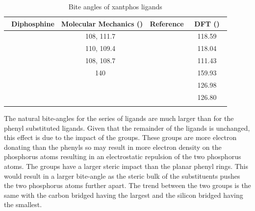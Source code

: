{\begin{table}[ht]
\small
\caption[Bite angles of xantphos ligands]{Bite angles of xantphos ligands}
\vspace{1em}
\label{table:biteanglescalculated}
\begin{center}
\begin{tabular}{c c c c}
	\toprule
	~\bfseries{Diphosphine}	&\bfseries{Molecular Mechanics (\degrees)}&\bfseries{Reference}	&\bfseries{DFT (\degrees)}\\
	\midrule		
	~\PhXantphos		~~&~108, 111.7~~	& ~\cite{Birkholz2009}	&~~118.59~~	\\	
	~\PhThixantphos	~~&~110, 109.4~~	& ~\cite{Birkholz2009, Kranenburg1995}&~~118.04~~	\\
	~\PhSixantphos	~~&~108, 108.7~~	& ~\cite{Birkholz2009, Kranenburg1995}&~~111.43~~	\\
	~\tBuXantphos		~~&~140~~		&~\cite{Birkholz2009}~~	&~~159.93~~	\\
	~\tBuThixantphos	~~&~~~			&~~~~			&~~126.98~~	\\
	~\tBuSixantphos	~~&~~~			&~~~~			&~~126.80~~	\\
	\bottomrule{}
\end{tabular}
\end{center}
\end{table}


The natural bite-angles for the \tBuxantphos{} series of ligands are much larger than for the phenyl substituted ligands.  Given that the remainder of the ligands is unchanged, this effect is due to the impact of the \tBu{} groups.  These groups are more electron donating than the phenyls so may result in more electron density on the phosphorus atoms resulting in an electrostatic repulsion of the two phosphorus atoms.  The \tBu{} groups have a larger steric impact than the planar phenyl rings.  This would result in a larger bite-angle as the steric bulk of the \tBu{} substituents pushes the two phosphorus atoms further apart.  The trend between the two groups is the same with the carbon bridged having the largest \biteangle{} and the silicon bridged having the smallest.

}
